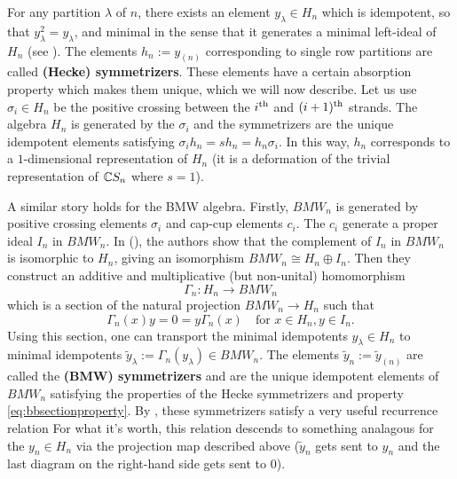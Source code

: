 For any partition $\lambda$ of $n$, there exists an element $y_\lambda \in H_n$ which is idempotent, so that $y_\lambda^2 = y_\lambda$, and minimal in the sense that it generates a minimal left-ideal of $H_n$ (see ). The elements $h_n := y_{(n)}$ corresponding to single row partitions are called \textbf{(Hecke) symmetrizers}. These elements have a certain absorption property which makes them unique, which we will now describe. Let us use $\sigma_i \in H_n$ be the positive crossing between the $i^{\rm{th}}$ and $(i+1)^{\rm{th}}$ strands. 
The algebra $H_n$ is generated by the $\sigma_i$ and the symmetrizers are the unique idempotent elements satisfying $\sigma_i h_n = s h_n = h_n \sigma_i$. In this way, $h_n$ corresponds to a $1$-dimensional representation of $H_n$ (it is a deformation of the trivial representation of $\mathbb{C} S_n$ where $s=1$).

A similar story holds for the BMW algebra. Firstly, $BMW_n$ is generated by positive crossing elements $\sigma_i$ and cap-cup elements $c_i$. 
The $c_i$ generate a proper ideal $I_n$ in $BMW_n$. In (), the authors show that the complement of $I_n$ in $BMW_n$ is isomorphic to $H_n$, giving an isomorphism $BMW_n \cong H_n \oplus I_n$. Then they construct an additive and multiplicative (but non-unital) homomorphism 
\[
\Gamma_n : H_n \to BMW_n
\]
which is a section of the natural projection $BMW_n \to H_n$ such that 
\begin{equation} \label{eq:bbsectionproperty}
\Gamma_n(x)y = 0 = y \Gamma_n(x) \quad \textrm{for } x \in H_n, y \in I_n.
\end{equation}
Using this section, one can transport the minimal idempotents $y_\lambda \in H_n$ to minimal idempotents $\tilde{y}_\lambda := \Gamma_n(y_\lambda) \in BMW_n$. The elements $\tilde{y}_n := \tilde{y}_{(n)}$ are called the \textbf{(BMW) symmetrizers} and are the unique idempotent elements of $BMW_n$ satisfying the properties of the Hecke symmetrizers and property \eqref{eq:bbsectionproperty}. By , these symmetrizers satisfy a very useful recurrence relation
For what it's worth, this relation descends to something analagous for the $y_n \in H_n$ via the projection map described above ($\tilde{y}_n$ gets sent to $y_n$ and the last diagram on the right-hand side gets sent to $0$). 

